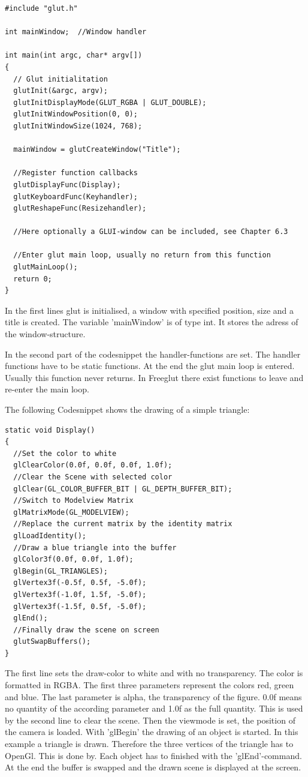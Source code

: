 \documentclass[10pt,a4paper,DIV=11]{scrreprt}
\begin{document}
\begin{lstlisting}[caption={Initialization a GLUT-program},label=lst:glut-init]
#include "glut.h"

int mainWindow;  //Window handler

int main(int argc, char* argv[])
{
  // Glut initialitation
  glutInit(&argc, argv);
  glutInitDisplayMode(GLUT_RGBA | GLUT_DOUBLE);
  glutInitWindowPosition(0, 0); 
  glutInitWindowSize(1024, 768);
  
  mainWindow = glutCreateWindow("Title");
  
  //Register function callbacks
  glutDisplayFunc(Display);
  glutKeyboardFunc(Keyhandler);
  glutReshapeFunc(Resizehandler);
  
  //Here optionally a GLUI-window can be included, see Chapter 6.3
  
  //Enter glut main loop, usually no return from this function
  glutMainLoop(); 
  return 0;
}
\end{lstlisting}

In the first lines glut is initialised, a window with specified position, size and a title is created.
The variable 'mainWindow' is of type int. It stores the adress of the window-structure.

In the second part of the codesnippet the handler-functions are set. The handler functions have to be static functions.
At the end the glut main loop is entered. Usually this function never returns. In Freeglut there exist functions to leave and re-enter the main loop.

The following Codesnippet shows the drawing of a simple triangle:

\begin{lstlisting}[caption={Drawing some graphics},label=lst:glut-draw]
static void Display()
{
  //Set the color to white
  glClearColor(0.0f, 0.0f, 0.0f, 1.0f);
  //Clear the Scene with selected color
  glClear(GL_COLOR_BUFFER_BIT | GL_DEPTH_BUFFER_BIT);
  //Switch to Modelview Matrix
  glMatrixMode(GL_MODELVIEW);
  //Replace the current matrix by the identity matrix
  glLoadIdentity();
  //Draw a blue triangle into the buffer
  glColor3f(0.0f, 0.0f, 1.0f);
  glBegin(GL_TRIANGLES);
  glVertex3f(-0.5f, 0.5f, -5.0f);
  glVertex3f(-1.0f, 1.5f, -5.0f);
  glVertex3f(-1.5f, 0.5f, -5.0f);
  glEnd();
  //Finally draw the scene on screen
  glutSwapBuffers();
}
\end{lstlisting}

The first line sets the draw-color to white and with no transparency. The color is formatted in RGBA. The first three parameters represent the colors red, green and blue. The last parameter is alpha, the transparency of the figure. 0.0f means no quantity of the according parameter and 1.0f as the full quantity.
 This is used by the second line to clear the scene.
Then the viewmode is set, the position of the camera is loaded.
With 'glBegin' the drawing of an object is started. In this example a triangle is drawn. Therefore the three vertices of the triangle has to OpenGl. This is done by. Each object has to finished with the 'glEnd'-command.
At the end the buffer is swapped and the drawn scene is displayed at the screen.
\end{document}
